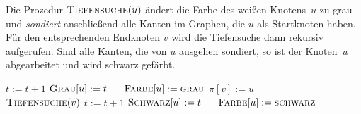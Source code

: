 \begin{bem} 
Die Prozedur $\cc{Tiefensuche}(u)$ ändert die Farbe des weißen Knotens~$u$ zu grau und \emph{sondiert} anschließend alle Kanten im Graphen, die $u$ als Startknoten haben.
Für den entsprechenden Endknoten $v$ wird die Tiefensuche dann rekursiv aufgerufen.
Sind alle Kanten, die von $u$ ausgehen sondiert, so ist der Knoten~$u$ abgearbeitet und wird schwarz gefärbt.

\begin{algorithm}[H]
	\caption{$\cc{Tiefensuche}(u)$}
	\begin{algorithmic}[1]
		\STATE $t := t + 1$ 
		\STATE $\mathop{\text{\textsc{Grau}}}[u] := t$ $\quad$ 
		\STATE $\mathop{\text{\textsc{Farbe}}}[u]:=\mathop{\text{\textsc{grau}}}$
		 \STATE $\pi[v]:=u$ $\qquad\qquad$ 
		\STATE $\mathop{\text{\textsc{Tiefensuche}}}(v)$
		\ENDIF
		\ENDFOR
		\STATE $t := t + 1$ 
		\STATE\label{line:schwarzfaerbung-in-tiefensuche} $\mathop{\text{\textsc{Schwarz}}}[u] := t$ $\quad$ 
		\STATE $\mathop{\text{\textsc{Farbe}}}[u]:=\mathop{\text{\textsc{schwarz}}}$
	\end{algorithmic}
\end{algorithm}
\end{bem}


